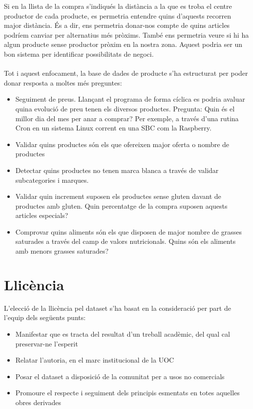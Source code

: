 \documentclass[]{scrartcl}
\begin{document}
Si en la llista de la compra s'indiqués la distància a la que es troba el centre productor de cada producte, es permetria entendre quins d'aquests recorren major distància. És a dir, ens permetria donar-nos compte de quins articles podríem canviar per alternatius més pròxims.
També ens permetria veure si hi ha algun producte sense productor pròxim en la nostra zona. Aquest podria ser un bon sistema per identificar possibilitats de negoci.
\\\\
Tot i aquest enfocament, la base de dades de producte s'ha estructurat per poder donar resposta a moltes més preguntes:
\begin{itemize}
	\item Seguiment de preus. Llançant el programa de forma cíclica es podria avaluar quina evolució de preu tenen els diversos productes. Pregunta: Quin és el millor dia del mes per anar a comprar? Per exemple, a través d'una rutina Cron en un sistema Linux corrent en una SBC com la Raspberry.
	\item Validar quins productes són els que ofereixen major oferta o nombre de productes
	\item Detectar quins productes no tenen marca blanca a través de validar subcategories i marques.
	\item Validar quin increment suposen els productes sense gluten davant de productes amb gluten. Quin percentatge de la compra suposen aquests articles especials?
	\item Comprovar quins aliments són els que disposen de major nombre de grasses saturades a través del camp de valors nutricionals. Quins són els aliments amb menors grasses saturades?
\end{itemize} 

\section{Llicència}
L’elecció de la llicència pel dataset s’ha basat en la consideració per part de l’equip dels següents punts:

\begin{itemize}
	\item Manifestar que es tracta del resultat d’un treball acadèmic, del qual cal preservar-ne l’esperit
	\item Relatar l’autoria, en el marc institucional de la UOC
	\item Posar el dataset a disposició de la comunitat per a usos no comercials
	\item Promoure el respecte i seguiment dels principis esmentats en totes aquelles obres derivades
\end{itemize} 
\end{document}
